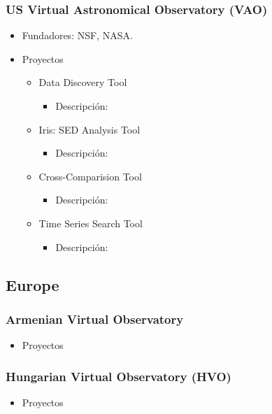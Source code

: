 \subsubsection{US Virtual Astronomical Observatory (VAO)}
	\begin{itemize}
		\item Fundadores: NSF, NASA.
		\item Proyectos
		\begin{itemize}
			\item Data Discovery Tool
			\begin{itemize}
				\item Descripción: 
			\end{itemize}
			\item Iris: SED Analysis Tool
			\begin{itemize}
				\item Descripción: 
			\end{itemize}
			\item Cross-Comparision Tool
			\begin{itemize}
				\item Descripción: 
			\end{itemize}
			\item Time Series Search Tool
			\begin{itemize}
				\item Descripción: 
			\end{itemize}
		\end{itemize}
	\end{itemize}

\subsection{Europe}
\subsubsection{Armenian Virtual Observatory}
	\begin{itemize}
		\item Proyectos
	\end{itemize}

\subsubsection{Hungarian Virtual Observatory (HVO)}
	\begin{itemize}
		\item Proyectos
	\end{itemize}

